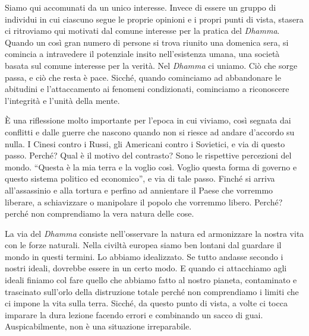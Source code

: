 
Siamo qui accomunati da un unico interesse. Invece di essere un gruppo
di individui in cui ciascuno segue le proprie opinioni e i propri punti
di vista, stasera ci ritroviamo qui motivati dal comune interesse per la
pratica del \textit{Dhamma}. Quando un così gran numero di persone si trova
riunito una domenica sera, si comincia a intravedere il potenziale
insito nell'esistenza umana, una società basata sul comune interesse per
la verità. Nel \textit{Dhamma} ci uniamo. Ciò che sorge passa, e ciò che resta è
pace. Sicché, quando cominciamo ad abbandonare le abitudini e
l'attaccamento ai fenomeni condizionati, cominciamo a riconoscere
l'integrità e l'unità della mente.

È una riflessione molto importante per l'epoca in cui viviamo, così
segnata dai conflitti e dalle guerre che nascono quando non si riesce ad
andare d'accordo su nulla. I Cinesi contro i Russi, gli Americani contro
i Sovietici, e via di questo passo. Perché? Qual è il motivo del
contrasto? Sono le rispettive percezioni del mondo. ``Questa è la mia
terra e la voglio così. Voglio questa forma di governo e questo sistema
politico ed economico'', e via di tale passo. Finché si arriva
all'assassinio e alla tortura e perfino ad annientare il Paese che
vorremmo liberare, a schiavizzare o manipolare il popolo che vorremmo
libero. Perché? perché non comprendiamo la vera natura delle cose.

La via del \textit{Dhamma} consiste nell'osservare la natura ed armonizzare la
nostra vita con le forze naturali. Nella civiltà europea siamo ben
lontani dal guardare il mondo in questi termini. Lo abbiamo idealizzato.
Se tutto andasse secondo i nostri ideali, dovrebbe essere in un certo
modo. E quando ci attacchiamo agli ideali finiamo col fare quello che
abbiamo fatto al nostro pianeta, contaminato e trascinato sull'orlo
della distruzione totale perché non comprendiamo i limiti che ci impone
la vita sulla terra. Sicché, da questo punto di vista, a volte ci tocca
imparare la dura lezione facendo errori e combinando un sacco di guai.
Auspicabilmente, non è una situazione irreparabile.

